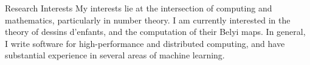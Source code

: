 \begin{rSection}{Research Interests}
My interests lie at the intersection of computing and mathematics, particularly in number theory. 
I am currently interested in the theory of dessins d'enfants, and the computation of their Belyi maps. In general, I write software for high-performance and distributed computing, and have substantial experience in several areas of machine learning.
\end{rSection}